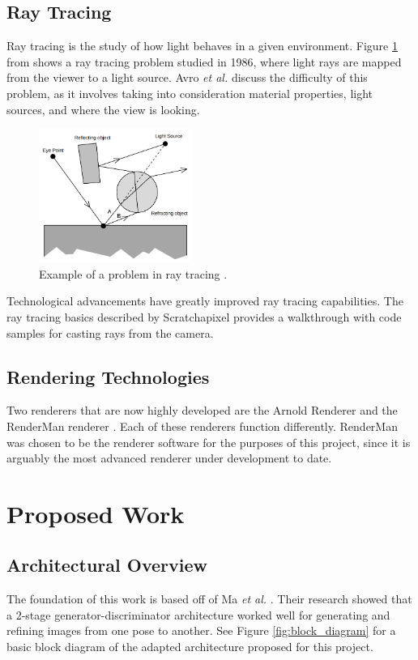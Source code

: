 \documentclass[conference]{IEEEtran}
\begin{document}
\subsection{Ray Tracing}
Ray tracing is the study of how light behaves in a given environment.
Figure \ref{fig:raytrace} from \cite{backwards_raytrace}
shows a ray tracing problem studied in 1986, where light rays are mapped from
the viewer to a light source. Avro \textit{et al.}
\cite{backwards_raytrace} discuss the difficulty of this problem,
as it involves taking into consideration material properties, light sources,
and where the view is looking.

\begin{figure}[htbp]
\centerline{\includegraphics[width=5cm]{raytrace.png}}
\caption{Example of a problem in ray tracing \cite{backwards_raytrace}.}
\label{fig:raytrace}
\end{figure}

Technological advancements have greatly improved ray tracing capabilities.
The ray tracing basics described by Scratchapixel \cite{raytrace_walkthrough}
provides a walkthrough with code samples for casting rays from the camera.

\subsection{Rendering Technologies}
Two renderers that are now highly developed are the Arnold Renderer \cite{arnold}
and the RenderMan renderer \cite{renderman}. Each of these renderers
function differently.
RenderMan was chosen to be the renderer software for the purposes of this project,
since it is arguably the most advanced renderer under development to date.

\section{Proposed Work}
\label{sec:proposed_work}
\subsection{Architectural Overview}
\label{subsec:architecture}
The foundation of this work is based off of Ma \textit{et al.} \cite{pose_guided_image_generation}.
Their research showed that a 2-stage generator-discriminator architecture worked well for generating
and refining images from one pose to another.
See Figure \ref{fig:block_diagram} for a basic block diagram of the adapted architecture
proposed for this project.
\end{document}
